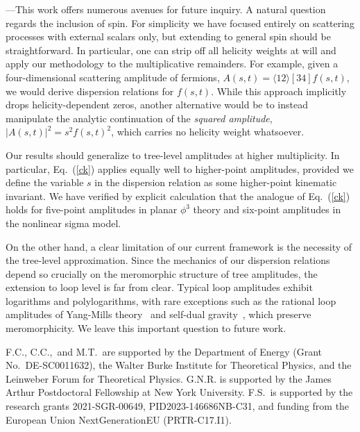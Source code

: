 \documentclass[twocolumn,english,aps,prd,reprint,floatfix,notitlepage,footinbib,preprintnumbers,superscriptaddress,longbibliography]{revtex4-1}
\newcommand{\Eq}[1]{Eq.~(\ref{#1})}
\newcommand{\mysec}[1]{\noindent {\bf #1.}---}
\begin{document}
\medskip
\mysec{Discussion}This work offers numerous avenues for future inquiry.
A natural question regards  the inclusion of spin.  For simplicity we have  focused entirely on scattering processes with external scalars only, but extending to general spin should be straightforward.  In particular, one can strip off all helicity weights at will and apply our methodology to the multiplicative remainders.  For example, given a four-dimensional scattering amplitude of fermions, $A(s,t) = \langle 12\rangle [34] f(s,t)$, we would derive dispersion relations for $f(s,t)$.   While this approach implicitly drops helicity-dependent zeros, another alternative would be to instead manipulate the analytic continuation of the {\it squared amplitude}, $|A(s,t)|^2 = s^2 f(s,t)^2$, which carries no helicity weight whatsoever.


Our results should generalize to tree-level amplitudes at higher multiplicity.  In particular, \Eq{ck} applies equally well to higher-point amplitudes, provided we define the variable $s$ in the dispersion relation as some higher-point kinematic invariant.  We have verified by explicit calculation that  the analogue of \Eq{ck} holds for five-point amplitudes in planar $\phi^3$ theory and six-point amplitudes in the nonlinear sigma model.


On the other hand, a clear limitation of our current framework is the necessity of the tree-level approximation. Since the mechanics of our dispersion relations depend so crucially on the meromorphic structure of tree amplitudes, the extension to loop level is far from clear.  Typical loop amplitudes exhibit  logarithms and polylogarithms, with rare exceptions such as the rational loop amplitudes of Yang-Mills theory~\cite{Henn_2020}  and self-dual gravity~\cite{Bern_1998}, which preserve meromorphicity. We leave this important question to future work.

\bigskip

F.C., C.C.,~and M.T.~are supported by the Department of Energy (Grant No.~DE-SC0011632), the Walter Burke Institute for Theoretical Physics, and the Leinweber Forum for Theoretical Physics.
G.N.R. is supported by the James Arthur Postdoctoral Fellowship at New York University. F.S.~is
supported by the research grants 2021-SGR-00649, PID2023-146686NB-C31, and funding from the European Union NextGenerationEU (PRTR-C17.I1).



\end{document}
